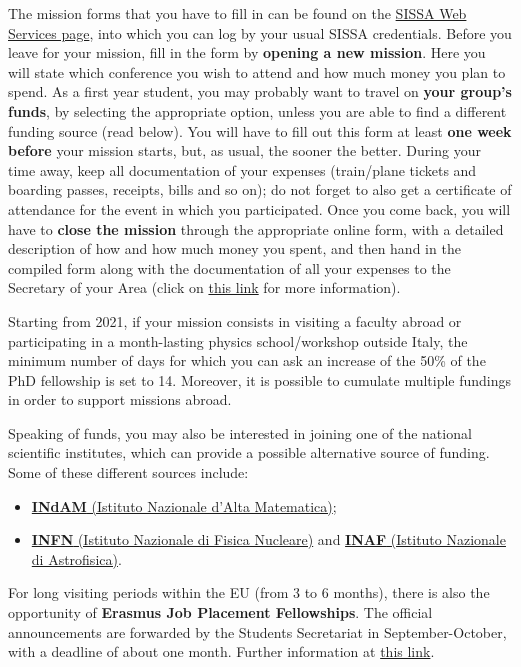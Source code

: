 \documentclass{sissavademecum}
\begin{document}
The mission forms that you have to fill in can be found on the \href{https://services.sissa.it/online/}{SISSA Web Services page}, into which you can log by your usual SISSA credentials. Before you leave for your mission, fill in the form by \textbf{opening a new mission}. Here you will state which conference you wish to attend and how much money you plan to spend. As a first year student, you may probably want to travel on \textbf{your group's funds}, by selecting the appropriate option, unless you are able to find a different funding source (read below). You will have to fill out this form at least \textbf{one week before} your mission starts, but, as usual, the sooner the better. During your time away, keep all documentation of your expenses (train/plane tickets and boarding passes, receipts, bills and so on); do not forget to also get a certificate of attendance for the event in which you participated. Once you come back, you will have to \textbf{close the mission} through the appropriate online form, with a detailed description of how and how much money you spent, and then hand in the compiled form along with the documentation of all your expenses to the Secretary of your Area (click on \href{http://wiki.sissa.it/students/index.php/SISSA_staff}{this link} for more information).

Starting from 2021, if your mission consists in visiting a faculty abroad or participating in a month-lasting physics school/workshop outside Italy, the minimum number of days for which you can ask an increase of the 50\% of the PhD fellowship is set to 14. Moreover, it is possible to cumulate multiple fundings in order to support missions abroad.

Speaking of funds, you may also be interested in joining one of the national scientific institutes, which can provide a possible alternative source of funding. Some of these different sources include:

\begin{itemize}
    \item \href{http://www.altamatematica.it}{ \textbf{INdAM} (Istituto Nazionale d'Alta Matematica)};
    \item \href{http://home.infn.it/en/}{\textbf{INFN} (Istituto Nazionale di Fisica Nucleare)} and \href{http://www.inaf.it/en?set_language=en}{\textbf{INAF} (Istituto Nazionale di Astrofisica)}.
\end{itemize}

For long visiting periods within the EU (from 3 to 6 months), there is also the opportunity of \textbf{Erasmus Job Placement Fellowships}. The official announcements are forwarded by the Students Secretariat in September-October, with a deadline of about one month. Further information at \href{http://wiki.sissa.it/students/index.php/Erasmus_\%2B_Programme}{this link}.
\end{document}

